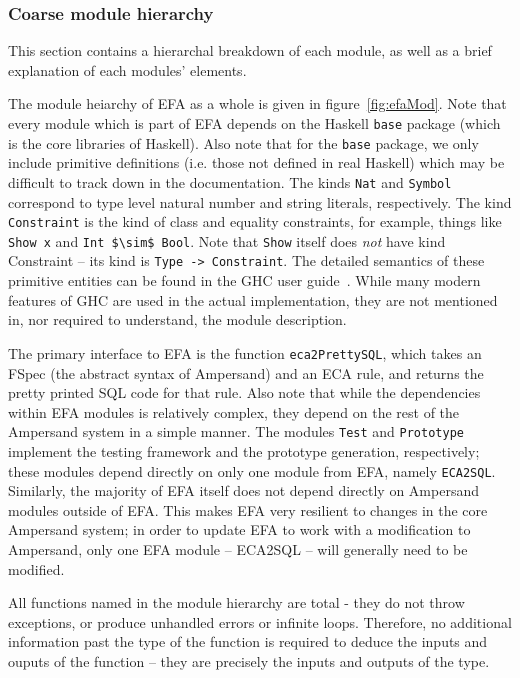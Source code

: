 \documentclass[12pt, svgnames]{article}
\let\Oldsubsubsection\subsubsection
\renewcommand{\subsubsection}{\FloatBarrier\Oldsubsubsection}
\begin{document}
\Oldsubsubsection{Coarse module hierarchy}

This section contains a hierarchal breakdown of each module, as well as a brief
explanation of each modules' elements. 

The module heiarchy of EFA as a whole is given in figure~\ref{fig:efaMod}.  Note
that every module which is part of EFA depends on the Haskell \texttt{base} package
(which is the core libraries of Haskell). Also note that for the \texttt{base}
package, we only include primitive definitions (i.e. those not defined in real
Haskell) which may be difficult to track down in the documentation. The kinds
 \lstinline{Nat} and \lstinline{Symbol} correspond to type level natural number and string
literals, respectively. The kind \lstinline{Constraint} is the kind of class and
equality constraints, for example, things like \lstinline{Show x} and \lstinline[mathescape]|Int $\sim$ Bool|.  
Note that \texttt{Show} itself does \emph{not} have kind Constraint --
its kind is \lstinline{Type -> Constraint}. The detailed semantics of these
primitive entities can be found in the GHC user guide~\cite{ghcUserGuide}. While
many modern features of GHC are used in the actual implementation, they are not
mentioned in, nor required to understand, the module description.

The primary interface to EFA is the function \lstinline{eca2PrettySQL}, which takes an
FSpec (the abstract syntax of Ampersand) and an ECA rule, and returns the pretty
printed SQL code for that rule. Also note that while the dependencies within EFA
modules is relatively complex, they depend on the rest of the Ampersand system
in a simple manner. The modules \lstinline{Test} and \lstinline{Prototype} implement the testing
framework and the prototype generation, respectively; these modules depend
directly on only one module from EFA, namely \lstinline{ECA2SQL}. Similarly, the
majority of EFA itself does not depend directly on Ampersand modules outside of
EFA. This makes EFA very resilient to changes in the core Ampersand system; in
order to update EFA to work with a modification to Ampersand, only one EFA
module -- ECA2SQL -- will generally need to be modified. 

All functions named in the module hierarchy are total - they do not throw
exceptions, or produce unhandled errors or infinite loops. Therefore, no
additional information past the type of the function is required to deduce the
inputs and ouputs of the function -- they are precisely the inputs and outputs
of the type.
\end{document}
